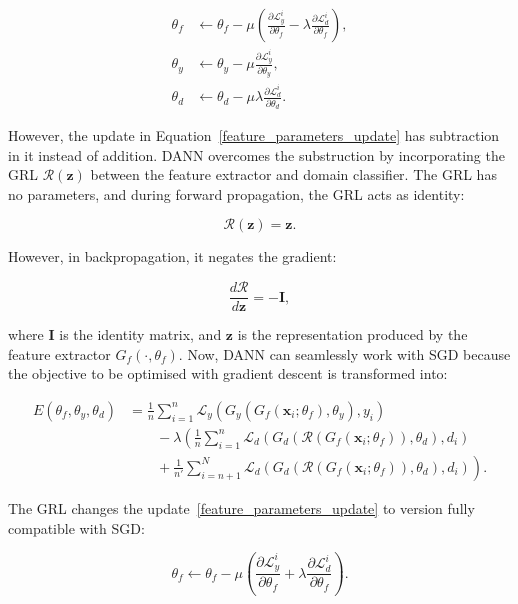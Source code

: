 \begin{align}
	\theta_f &\gets \theta_f - \mu \left(
	\frac{\partial \mathcal{L}_y^i}{\partial \theta_f}
	- \lambda \frac{\partial \mathcal{L}_d^i}{\partial \theta_f}
	\right),
	\label{feature_parameters_update} \\
	\theta_y &\gets \theta_y - \mu
	\frac{\partial \mathcal{L}_y^i}{\partial \theta_y}, \\
	\theta_d &\gets \theta_d - \mu \lambda
	\frac{\partial \mathcal{L}_d^i}{\partial \theta_d}.
\end{align}

However, the update in Equation~\ref{feature_parameters_update} has subtraction in it instead of addition.
DANN overcomes the substruction by incorporating the GRL \(\mathcal{R}(\mathbf{z})\) between the feature extractor and domain classifier.
The GRL has no parameters, and during forward propagation, the GRL acts as identity:

\begin{equation}
	\mathcal{R}(\mathbf{z}) = \mathbf{z}.
\end{equation}

However, in backpropagation, it negates the gradient:

\begin{equation}
	\frac{d \mathcal{R}}{d \mathbf{z}} = -\mathbf{I},
\end{equation}

where \(\mathbf{I}\) is the identity matrix,
and \(\mathbf{z}\) is the representation produced by the feature extractor
\(G_f(\cdot, \theta_f)\).
Now, DANN can seamlessly work with SGD
because the objective to be optimised with gradient descent is transformed into:

\begin{align}
	E(\theta_f, \theta_y, \theta_d) &= \frac{1}{n} \sum^{n}_{i = 1} \mathcal{L}_y(G_y(G_f(\mathbf{x}_i; \theta_f), \theta_y), y_i) \nonumber \\
	&\qquad {} - \lambda \left(\frac{1}{n} \sum^{n}_{i = 1} \mathcal{L}_d(G_d(\mathcal{R}(G_f(\mathbf{x}_i; \theta_f)), \theta_d), d_i) \right. \nonumber \\
	&\qquad \left. {} + \frac{1}{n'} \sum^{N}_{i = n + 1} \mathcal{L}_d(G_d(\mathcal{R}(G_f(\mathbf{x}_i; \theta_f)), \theta_d), d_i)\right).
	\label{dann_loss}
\end{align}

The GRL changes the update~\ref{feature_parameters_update}
to version fully compatible with SGD:

\begin{equation}
	\theta_f \gets \theta_f - \mu \left(
	\frac{\partial \mathcal{L}_y^i}{\partial \theta_f}
	+ \lambda \frac{\partial \mathcal{L}_d^i}{\partial \theta_f}
	\right).
\end{equation}

